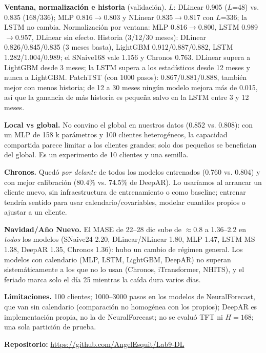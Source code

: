 \documentclass[10pt,letterpaper]{extarticle}
\newcommand{\PTMONTHS}{PatchTST (con 1000 pasos): 0.867/0.881/0.888, también mejor con menos historia; de 12 a 30 meses ningún modelo mejora más de 0.015, así que la ganancia de más historia es pequeña salvo en la LSTM entre 3 y 12 meses.}
\begin{document}
\textbf{Ventana, normalización e historia} (validación). $L$: DLinear 0.905 ($L$=48) vs. 0.835 (168/336); MLP 0.816$\to$0.803 y NLinear 0.835$\to$0.817 con $L$=336; la LSTM no cambia. Normalización por ventana: MLP 0.816$\to$0.800, LSTM 0.989$\to$0.957, DLinear sin efecto.
Historia (3/12/30 meses): DLinear 0.826/0.845/0.835 (3 meses basta), LightGBM 0.912/0.887/0.882, LSTM 1.282/1.004/0.989; el SNaive168 vale 1.156 y Chronos 0.763. DLinear supera a LightGBM desde 3 meses; la LSTM supera a los estadísticos desde 12 meses y nunca a LightGBM. \PTMONTHS


\textbf{Local vs global.} No convino el global en nuestros datos (0.852 vs. 0.808): con un MLP de 158 k parámetros y 100 clientes heterogéneos, la capacidad compartida parece limitar a los clientes grandes; solo dos pequeños se benefician del global. Es un experimento de 10 clientes y una semilla.


\textbf{Chronos.} Quedó \emph{por delante} de todos los modelos entrenados (0.760 vs. 0.804) y con mejor calibración (80.4\% vs. 74.5\% de DeepAR). Lo usaríamos al arrancar un cliente nuevo, sin infraestructura de entrenamiento o como baseline; entrenar tendría sentido para usar calendario/covariables, modelar cuantiles propios o ajustar a un cliente.


\textbf{Navidad/Año Nuevo.} El MASE de 22--28 dic sube de $\approx$0.8 a 1.36--2.2 en \emph{todos} los modelos (SNaive24 2.20, DLinear/NLinear 1.80, MLP 1.47, LSTM MS 1.38, DeepAR 1.35, Chronos 1.36): hubo un cambio de régimen general. Los modelos con calendario (MLP, LSTM, LightGBM, DeepAR) no superan sistemáticamente a los que no lo usan (Chronos, iTransformer, NHITS), y el feriado marca solo el día 25 mientras la caída dura varios días.


\textbf{Limitaciones.} 100 clientes; 1000--3000 pasos en los modelos de NeuralForecast, que van sin calendario (comparación no homogénea con los propios); DeepAR es implementación propia, no la de NeuralForecast; no se evaluó TFT ni $H=168$; una sola partición de prueba.

\medskip
\noindent\textbf{Repositorio:} \url{https://github.com/AngelEsquit/Lab9-DL}
\end{document}
